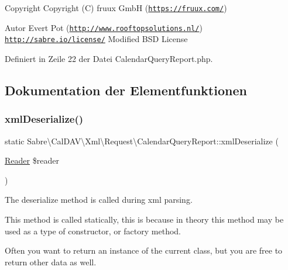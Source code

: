 \begin{DoxyCopyright}{Copyright}
Copyright (C) fruux GmbH (\href{https://fruux.com/}{\tt https\+://fruux.\+com/}) 
\end{DoxyCopyright}
\begin{DoxyAuthor}{Autor}
Evert Pot (\href{http://www.rooftopsolutions.nl/}{\tt http\+://www.\+rooftopsolutions.\+nl/})  \href{http://sabre.io/license/}{\tt http\+://sabre.\+io/license/} Modified B\+SD License 
\end{DoxyAuthor}


Definiert in Zeile 22 der Datei Calendar\+Query\+Report.\+php.



\subsection{Dokumentation der Elementfunktionen}
\mbox{\label{class_sabre_1_1_cal_d_a_v_1_1_xml_1_1_request_1_1_calendar_query_report_a4302daa8f9bd88cecaa13fcfa3767013}} 
\subsubsection{\texorpdfstring{xml\+Deserialize()}{xmlDeserialize()}}
{\footnotesize\ttfamily static Sabre\textbackslash{}\+Cal\+D\+A\+V\textbackslash{}\+Xml\textbackslash{}\+Request\textbackslash{}\+Calendar\+Query\+Report\+::xml\+Deserialize (\begin{DoxyParamCaption}\item[{\mbox{\hyperlink{class_sabre_1_1_xml_1_1_reader}{Reader}}}]{\$reader }\end{DoxyParamCaption})\hspace{0.3cm}{\ttfamily [static]}}

The deserialize method is called during xml parsing.

This method is called statically, this is because in theory this method may be used as a type of constructor, or factory method.

Often you want to return an instance of the current class, but you are free to return other data as well.

